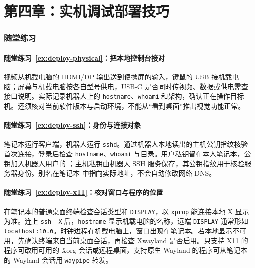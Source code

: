 \section*{第四章：实机调试部署技巧}
{}
\subsubsection*{随堂练习}

\paragraph*{随堂练习~\ref{ex:deploy-physical}：把本地控制台接对}
\begin{solution}
视频从机载电脑的 HDMI/DP 输出送到便携屏的输入，键鼠的 USB 接机载电脑；屏幕与机载电脑按各自型号供电，USB-C 是否同时传视频、数据或供电需查接口说明。实际记录机器人上的 \texttt{hostname}、\texttt{whoami} 和架构，确认正在操作目标机。还须核对当前软件版本与启动环境，不能从“看到桌面”推出视觉功能正常。
\end{solution}

\paragraph*{随堂练习~\ref{ex:deploy-ssh}：身份与连接对象}
\begin{solution}
笔记本运行客户端，机器人运行 \texttt{sshd}。通过机器人本地读出的主机公钥指纹核验首次连接，登录后检查 \texttt{hostname}、\texttt{whoami} 与目录。用户私钥留在本人笔记本，公钥加入机器人用户的 ；主机私钥由机器人 SSH 服务保存，其公钥指纹用于核验服务器身份。别名在笔记本  中指向实际地址，不会自动修改网络 DNS。
\end{solution}

\paragraph*{随堂练习~\ref{ex:deploy-x11}：核对窗口与程序的位置}
\begin{solution}
在笔记本的普通桌面终端检查会话类型和 \texttt{DISPLAY}，以 \texttt{xprop} 能连接本地 X 显示为准。连上 \texttt{ssh -X} 后，\texttt{hostname} 显示机载电脑的名称，远端 \texttt{DISPLAY} 通常形如 \texttt{localhost:10.0}。时钟进程在机载电脑上，窗口出现在笔记本。若本地显示不可用，先确认终端来自当前桌面会话，再检查 Xwayland 是否启用。只支持 X11 的程序可改用可用的 Xorg 会话或远程桌面，支持原生 Wayland 的程序可从笔记本的 Wayland 会话用 \texttt{waypipe} 转发。
\end{solution}

